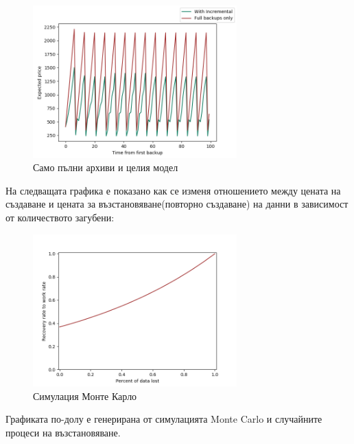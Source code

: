 \documentclass[11pt, a4paper]{article}
\theoremstyle{definition}
\begin{document}
		\begin{figure}[H]
			\begin{minipage}{1.0\textwidth}
				\centering
				\includegraphics[width=0.7\textwidth]{Weekly_full.png}
				\caption{Само пълни архиви и целия модел}\label{Fig:FullWeekly}
			\end{minipage}
		\end{figure}
		На следващата графика е показано как се изменя отношението между цената на създаване и цената за възстановяване(повторно създаване) на данни в зависимост от количеството загубени:
		\begin{figure}[H]
			\begin{minipage}{1.0\textwidth}
				\centering
				\includegraphics[width=0.7\textwidth]{Recovery_rate.png}
				\caption{Симулация Монте Карло}\label{Fig:Rec_rate}
			\end{minipage}
		\end{figure}
		Графиката по-долу е генерирана от симулацията Monte Carlo и случайните процеси на възстановяване.
\end{document}

